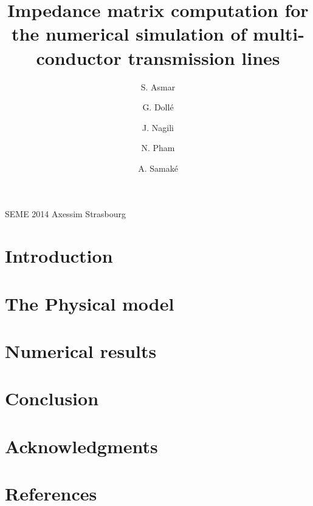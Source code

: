 \documentclass[11pt,a4paper,1p,sort&compress]{elsarticle}
\date{}%
\begin{document}
\begin{frontmatter}


\title{Impedance matrix computation for the numerical simulation of
multi-conductor transmission lines}

\author[ad1]{S. Asmar}
\ead{}
\author[ad2]{G. Dollé}
\author[ad3]{J. Nagili}
\ead{}
\author[ad2]{N. Pham}
\author[ad4]{A. Samaké}
\ead{}

\address[ad1]{Université de Montpelier 2 /  ???????????? }
\address[ad2]{Université de Strasbourg / CNRS, IRMA / UMR  7501. Strasbourg, F-67000, France}
\address[ad3]{Université ??????????????????}
\address[ad4]{Université de Grenoble 1 / CNRS, Laboratoire Jean Kuntzmann / UMR 5224, Grenoble, F-38041, France}


\begin{abstract}
  
\end{abstract}

\begin{keyword}
SEME 2014 Axessim Strasbourg
\end{keyword}

\end{frontmatter}


\section*{Introduction}
\label{sec:Introdution}


\section*{The Physical model}
\label{sec:Model}


\section*{Numerical results}
\label{sec:Results}


\section*{Conclusion}
\label{sec:Conclusion}


\section*{Acknowledgments}
\label{sec:Acknowledgments}

\section*{References}
\label{sec:References}




\nocite{*}
\end{document}
